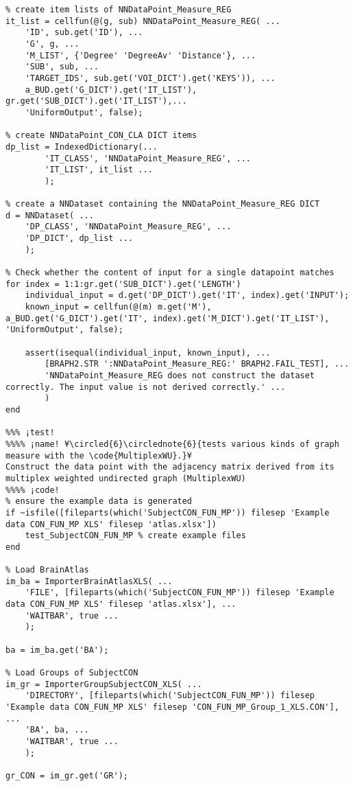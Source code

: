 \documentclass{tufte-handout}
\begin{document}
\begin{lstlisting}
% create item lists of NNDataPoint_Measure_REG
it_list = cellfun(@(g, sub) NNDataPoint_Measure_REG( ...
    'ID', sub.get('ID'), ...
    'G', g, ...
    'M_LIST', {'Degree' 'DegreeAv' 'Distance'}, ...
    'SUB', sub, ...
    'TARGET_IDS', sub.get('VOI_DICT').get('KEYS')), ...
    a_BUD.get('G_DICT').get('IT_LIST'), gr.get('SUB_DICT').get('IT_LIST'),...
    'UniformOutput', false);

% create NNDataPoint_CON_CLA DICT items
dp_list = IndexedDictionary(...
        'IT_CLASS', 'NNDataPoint_Measure_REG', ...
        'IT_LIST', it_list ...
        );

% create a NNDataset containing the NNDataPoint_Measure_REG DICT
d = NNDataset( ...
    'DP_CLASS', 'NNDataPoint_Measure_REG', ...
    'DP_DICT', dp_list ...
    );

% Check whether the content of input for a single datapoint matches
for index = 1:1:gr.get('SUB_DICT').get('LENGTH')
    individual_input = d.get('DP_DICT').get('IT', index).get('INPUT');
    known_input = cellfun(@(m) m.get('M'), a_BUD.get('G_DICT').get('IT', index).get('M_DICT').get('IT_LIST'), 'UniformOutput', false);

    assert(isequal(individual_input, known_input), ...
        [BRAPH2.STR ':NNDataPoint_Measure_REG:' BRAPH2.FAIL_TEST], ...
        'NNDataPoint_Measure_REG does not construct the dataset correctly. The input value is not derived correctly.' ...
        )
end

%%% ¡test!
%%%% ¡name! ¥\circled{6}\circlednote{6}{tests various kinds of graph measure with the \code{MultiplexWU}.}¥
Construct the data point with the adjacency matrix derived from its multiplex weighted undirected graph (MultiplexWU) 
%%%% ¡code!
% ensure the example data is generated
if ~isfile([fileparts(which('SubjectCON_FUN_MP')) filesep 'Example data CON_FUN_MP XLS' filesep 'atlas.xlsx'])
    test_SubjectCON_FUN_MP % create example files
end

% Load BrainAtlas
im_ba = ImporterBrainAtlasXLS( ...
    'FILE', [fileparts(which('SubjectCON_FUN_MP')) filesep 'Example data CON_FUN_MP XLS' filesep 'atlas.xlsx'], ...
    'WAITBAR', true ...
    );

ba = im_ba.get('BA');

% Load Groups of SubjectCON
im_gr = ImporterGroupSubjectCON_XLS( ...
    'DIRECTORY', [fileparts(which('SubjectCON_FUN_MP')) filesep 'Example data CON_FUN_MP XLS' filesep 'CON_FUN_MP_Group_1_XLS.CON'], ...
    'BA', ba, ...
    'WAITBAR', true ...
    );

gr_CON = im_gr.get('GR');


\end{lstlisting}
\end{document}
